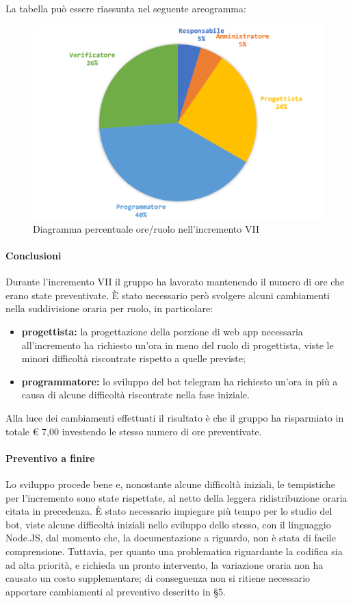 		La tabella può essere riassunta nel seguente areogramma:
		\begin{figure}[H]
			\centering
			\includegraphics[width=0.8\linewidth]{images/consuntivo/ConsIncr7-2.png}
			\caption{Diagramma percentuale ore/ruolo nell'incremento VII}
			\label{fig:consuntivo diagramma costi ruolo incremento VII}
		\end{figure}
		
		\paragraph{Conclusioni}
			Durante l'incremento VII il gruppo ha lavorato mantenendo il numero di ore che erano state preventivate. È stato necessario però svolgere alcuni cambiamenti nella suddivisione oraria per ruolo, in particolare:
		\begin{itemize}
			\item \textbf{progettista:} la progettazione della porzione di web app necessaria all'incremento ha richiesto un'ora in meno del ruolo di progettista, viste le minori difficoltà riscontrate rispetto a quelle previste;
			\item \textbf{programmatore:} lo sviluppo del bot telegram ha richiesto un'ora in più a causa di alcune difficoltà riscontrate nella fase iniziale.
		\end{itemize}
			Alla luce dei cambiamenti effettuati il risultato è che il gruppo ha risparmiato in totale € 7,00 investendo le stesso numero di ore preventivate.
		
		\paragraph{Preventivo a finire}
			Lo sviluppo procede bene e, nonostante alcune difficoltà iniziali, le tempistiche per l'incremento sono state rispettate, al netto della leggera ridistribuzione oraria citata in precedenza.
			\newline
			È stato necessario impiegare più tempo per lo studio del bot, viste alcune difficoltà iniziali nello sviluppo dello stesso, con il linguaggio Node.JS, dal momento che, la documentazione a riguardo, non è stata di facile comprensione.
			\newline
			Tuttavia, per quanto una problematica riguardante la codifica sia ad alta priorità, e richieda un pronto intervento, la variazione oraria non ha causato un costo supplementare; di conseguenza non si ritiene necessario apportare cambiamenti al preventivo descritto in \S5.
		
